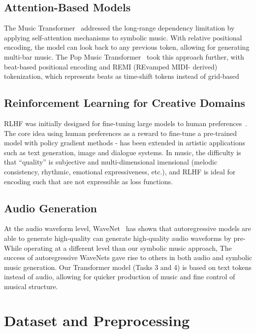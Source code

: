 \documentclass[conference]{IEEEtran}
\begin{document}
\subsection{Attention-Based Models}

The Music Transformer~\cite{huang2019} addressed the long-range dependency limitation by applying self-attention mechanisms to symbolic music. With relative positional encoding, the
model can look back to any previous token,
allowing for generating multi-bar music. The Pop Music Transformer~\cite{huang2020} took this approach further, with
beat-based positional encoding and REMI (REvamped MIDI-
derived) tokenization, which represents beats as
time-shift tokens instead of grid-based
\subsection{Reinforcement Learning for Creative Domains}
RLHF was initially designed for fine-tuning large
models to human preferences~\cite{ouyang2022}. The core idea using
human preferences as a reward to fine-tune a pre-trained
model with policy gradient methods - has been extended
in artistic applications such as text generation, image
and dialogue systems. In music, the difficulty
is that “quality” is subjective and multi-dimensional
imensional (melodic consistency, rhythmic, emotional
expressiveness, etc.), and RLHF is ideal for encoding such
that are not expressible as loss functions.

\subsection{Audio Generation}

At the audio waveform level, WaveNet~\cite{wavenet2016} has shown that
autoregressive models are able to generate high-quality
can generate high-quality audio waveforms by pre- While operating
at a different level than our symbolic music approach,
The success of autoregressive WaveNets gave rise to
others in both audio and symbolic music generation.
Our Transformer model (Tasks 3 and 4) is based
on text tokens instead of audio, allowing for quicker
production of music and fine control of musical structure.
\section{Dataset and Preprocessing}
\end{document}
